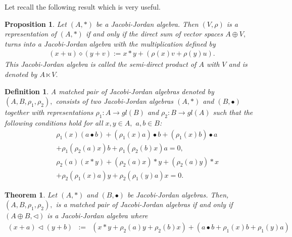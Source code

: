 \documentclass[12pt]{amsart}
\newtheorem{theorem}[Theorem]{Theorem}
\newtheorem{definition}[Theorem]{Definition}
\newtheorem{proposition}[Theorem]{Proposition}
\begin{document}
	Let recall the following result which is very useful.
	\begin{proposition}\label{spHJJ}\cite{absb}
		Let $(A,\ast)$ be a 
		Jacobi-Jordan algebra. Then $(V, \rho)$ is a representation of $(A, \ast)$ if and only if the direct sum of vector spaces $A\oplus V,$  turns into a 
		Jacobi-Jordan
		algebra with the multiplication defined by
		\begin{eqnarray}
			(x+u)\diamond (y+v):=x\ast y+(\rho(x)v+\rho(y)u).\label{SdpHJJ1}
		\end{eqnarray}
		This Jacobi-Jordan algebra is called the semi-direct product of $A$ with $V$ and is denoted by $A\ltimes V.$
	\end{proposition}
	\begin{definition}
		A matched pair of Jacobi-Jordan algebras denoted by $(A, B,\rho_1,\rho_2),$ consists of two Jacobi-Jordan algebras $(A,\ast)$ and 
		$(B,\bullet)$ together with representations $\rho_1: A\rightarrow gl(B)$ and 
		$\rho_2: B\rightarrow gl(A)$  such that   the following conditions hold for all $x,y\in A,$ $a,b\in B$:
		\begin{eqnarray}
			&& \rho_1(x)(a\bullet b)+(\rho_1(x)a)\bullet b+(\rho_1(x)b)\bullet a\nonumber\\
			&&+\rho_1(\rho_2(a)x)b+\rho_1(\rho_2(b)x)a=0,\label{mpHJJ1}\\
			&& \rho_2(a)(x\ast y)+(\rho_2(a)x)\ast y+(\rho_2(a)y)\ast x\nonumber\\
			&&+\rho_2(\rho_1(x)a)y+\rho_2(\rho_1(y)a)x=0.\label{mpHJJ2}
		\end{eqnarray}
	\end{definition}
	\begin{theorem}
		Let $(A,\ast)$ and 
		$(B,\bullet)$ be Jacobi-Jordan algebras. Then,
		$(A,B,\rho_1,\rho_2),$ is a matched pair of Jacobi-Jordan algebras if and only if  $(A\oplus B, \triangleleft)$ is a Jacobi-Jordan algebra where
		\begin{eqnarray}
			(x+a)\triangleleft(y+b)&:=&(x\ast y+\rho_2(a)y+\rho_2(b)x)+(a\bullet b+\rho_1(x)b+\rho_1(y)a) \label{opHJJ1}
		\end{eqnarray}
	\end{theorem}
\end{document}
